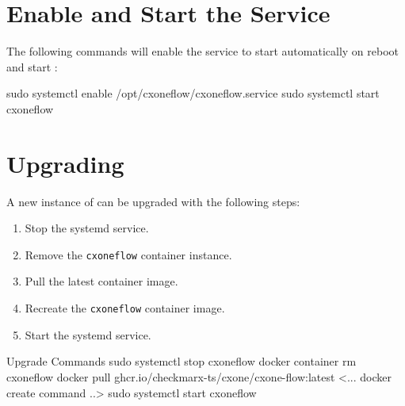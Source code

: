 \section{Enable and Start the \cxoneflow Service}

The following commands will enable the service to start automatically 
on reboot and start \cxoneflow:

\begin{code}{}{}{}
sudo systemctl enable /opt/cxoneflow/cxoneflow.service
sudo systemctl start cxoneflow
\end{code}

\section{Upgrading}

A new instance of \cxoneflow can be upgraded with the following steps:

\begin{enumerate}
  \item Stop the \cxoneflow systemd service.
  \item Remove the \texttt{cxoneflow} container instance.
  \item Pull the latest \cxoneflow container image.
  \item Recreate the \texttt{cxoneflow} container image.
  \item Start the \cxoneflow systemd service.
\end{enumerate}



\begin{code}{Upgrade Commands}{}{}
  sudo systemctl stop cxoneflow
  docker container rm cxoneflow
  docker pull ghcr.io/checkmarx-ts/cxone/cxone-flow:latest
  <... docker create command ..>
  sudo systemctl start cxoneflow
\end{code}
 


